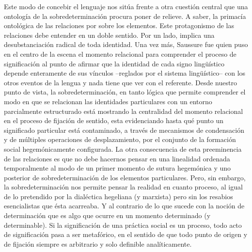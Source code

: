 Este modo de concebir el lenguaje nos sitúa frente a otra cuestión
central que una ontología de la sobredeterminación procura poner de
relieve. A saber, la primacía ontológica de las relaciones por sobre los
elementos. Este protagonismo de las relaciones debe entender en un doble
sentido. Por un lado, implica una desubstanciación radical de toda
identidad. Una vez más, Saussure fue quien puso en el centro de la
escena el momento relacional para comprender el proceso de significación
al punto de afirmar que la identidad de cada signo lingüístico depende
enteramente de sus vínculos --reglados por el sistema lingüístico-- con
los otros eventos de la lengua y nada tiene que ver con el referente.
Desde nuestro punto de vista, la sobredeterminación, en tanto lógica que
permite comprender el modo en que se relacionan las identidades
particulares con un entorno parcialmente estructurado está mostrando la
centralidad del momento relacional en el proceso de fijación de sentido,
esta evidenciando hasta qué punto un significado particular está
contaminado, a través de mecanismos de condensación y de múltiples
operaciones de desplazamiento, por el conjunto de la formación social
hegemónicamente configurada. La otra consecuencia de esta preeminencia
de las relaciones es que no debe hacernos pensar en una linealidad
ordenada temporalmente al modo de un primer momento de sutura hegemónica
y uno posterior de sobredeterminación de los elementos particulares.
Pero, sin embargo, la sobredeterminación nos permite pensar la realidad
en cuanto proceso, al igual de lo pretendido por la dialéctica hegeliana
(y marxista) pero sin los resabios esencialistas que ésta acarreaba. Y
al contrario de lo que sucede con la noción de determinación que es algo
que ocurre en un momento determinado (y determinable). Si la
significación de una práctica social es un proceso, todo acto de
significación pasa a ser metafórico, en el sentido de que todo punto de
origen y de fijación siempre es arbitrario y solo definible
analíticamente.

